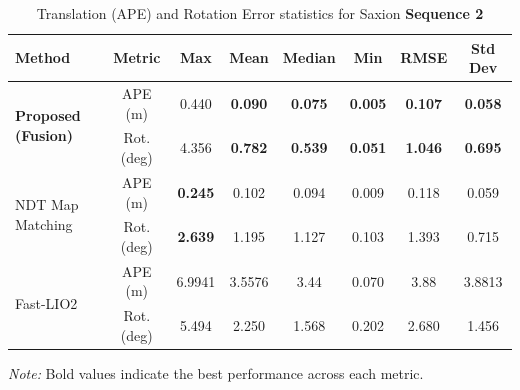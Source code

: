 \begin{table}[H]
	\centering
	\renewcommand{\arraystretch}{0.6}
	\setlength{\tabcolsep}{15pt}
	\caption{Translation (APE) and Rotation Error statistics for Saxion \textbf{Sequence 2} }
	\label{tab:ape_rot_saxion_seq2}
	
	\begin{adjustbox}{width=\textwidth}
		\begin{tabular}{@{}lccccccc@{}}
			\toprule
			\textbf{Method} & \textbf{Metric} & \textbf{Max} & \textbf{Mean} & \textbf{Median} & \textbf{Min} & \textbf{RMSE} & \textbf{Std Dev} \\
			\midrule
			
			\multirow{2}{*}{\textbf{Proposed (Fusion)}} 
			& APE (m)        & 0.440   & \textbf{0.090}   & \textbf{0.075}     & \textbf{0.005}   & \textbf{0.107}   & \textbf{0.058} \\
			& Rot. (deg)     & 4.356   & \textbf{0.782}   & \textbf{0.539}     & \textbf{0.051}   & \textbf{1.046}   & \textbf{0.695} \\
			\midrule
			
			\multirow{2}{*}{NDT Map Matching} 
			& APE (m)        & \textbf{0.245}   & 0.102   & 0.094     & 0.009    & 0.118   & 0.059 \\
			& Rot. (deg)     & \textbf{2.639}   & 1.195   & 1.127     & 0.103    & 1.393   & 0.715 \\
			\midrule
			
			\multirow{2}{*}{Fast-LIO2} 
			& APE (m)        & 6.9941   & 3.5576  & 3.44     & 0.070    & 3.88  & 3.8813 \\
			& Rot. (deg)     & 5.494   & 2.250   & 1.568     & 0.202    & 2.680   & 1.456 \\
			\bottomrule
		\end{tabular}
	\end{adjustbox}

\vspace{0.5em}
{\footnotesize \textit{Note:} Bold values indicate the best performance across each metric.}
\end{table}

